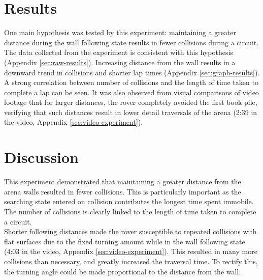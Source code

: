 \documentclass[a4paper,12pt,twocolumn]{article}
\begin{document}
\section{Results}
One main hypothesis was tested by this experiment: maintaining a greater distance during the wall following state results in fewer collisions during a circuit.
The data collected from the experiment is consistent with this hypothesis (Appendix \ref{sec:raw-results}). Increasing distance from the wall results in a downward trend in collisions and shorter lap times (Appendix \ref{sec:graph-results}). A strong correlation between number of collisions and the length of time taken to complete a lap can be seen. It was also observed from visual comparisons of video footage that for larger distances, the rover completely avoided the first book pile, verifying that such distances result in lower detail traversals of the arena (2:39 in the video, Appendix \ref{sec:video-experiment}). 


\section{Discussion}
This experiment demonstrated that maintaining a greater distance from the arena walls resulted in fewer collisions. This is particularly important as the searching state entered on collision contributes the longest time spent immobile. The number of collisions is clearly linked to the length of time taken to complete a circuit.\\

Shorter following distances made the rover susceptible to repeated collisions with flat surfaces due to the fixed turning amount while in the wall following state (4:03 in the video, Appendix \ref{sec:video-experiment}). This resulted in many more collisions than necessary, and greatly increased the traversal time. To rectify this, the turning angle could be made proportional to the distance from the wall.

\end{document}
